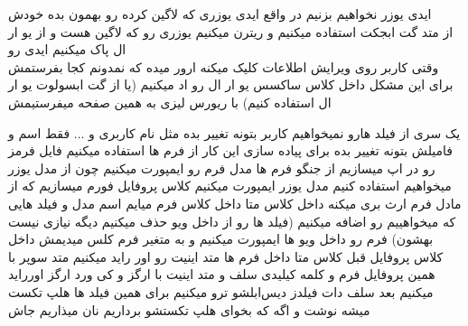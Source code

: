 \documentclass{article}
\begin{document}
		
		
		 ایدی یوزر نخواهیم بزنیم در واقع ایدی یوزری که لاگین کرده رو بهمون بده خودش \\
		از متد گت ابجکت استفاده میکنیم و ریترن میکنیم یوزری رو که لاگین هست و از یو ار ال پاک میکنیم ایدی رو\\
		
		 وقتی کاربر روی ویرایش اطلاعات کلیک میکنه ارور میده که نمدونم کجا بفرستمش برای این مشکل داخل کلاس ساکسس یو ار ال
		رو اد میکنیم (یا از گت ابسولوت یو ار ال استفاده کنیم) با ریورس لیزی به همین صفحه میفرستیمش
		
	
		 یک سری از فیلد هارو نمیخواهیم کاربر بتونه تغییر بده مثل نام کاربری و ... فقط اسم و فامیلش بتونه تغییر بده برای 
		پیاده سازی این کار از فرم ها استفاده میکنیم 
			 فایل فرمز رو در اپ میسازیم
			 از جنگو فرم ها مدل فرم رو ایمپورت میکنیم چون از مدل یوزر میخواهیم استفاده کنیم
			 مدل یوزر ایمپورت میکنیم 
			 کلاس پروفایل فورم میسازیم که از مادل فرم ارث بری میکنه
			 داخل کلاس متا داخل کلاس فرم میایم اسم مدل و فیلد هایی که میخواهییم رو اضافه میکنیم (فیلد ها رو از داخل ویو حذف میکنیم
			دیگه نیازی نیست بهشون)
			 فرم رو داخل ویو ها ایمپورت میکنیم و به متغیر فرم کلس میدیمش داخل کلاس پروفایل
			 قبل کلاس متا داخل فرم ها متد اینیت رو اور راید میکنیم
			 متد سوپر با همین پروفایل فرم و کلمه کیلیدی سلف و متد اینیت با ارگز و کی ورد ارگز اورراید میکنیم
			 بعد سلف دات فیلدز دیس‌ابلشو ترو میکنیم
			 برای همین فیلد ها هلپ تکست میشه نوشت و اگه که بخوای هلپ تکستشو برداریم نان میذاریم جاش
\end{document}
